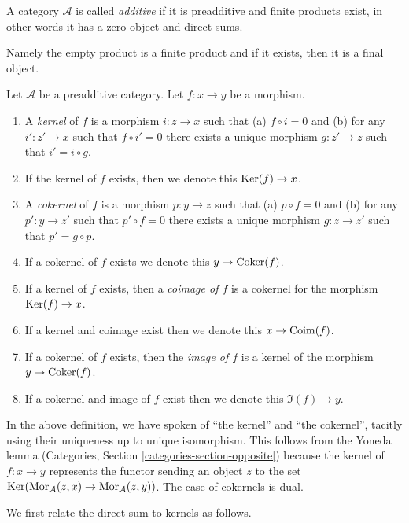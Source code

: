 \begin{definition}
\label{definition-additive-category}
A category $\mathcal{A}$ is called {\it
additive}
if it is preadditive and finite products
exist, in other
words it has a zero object and direct sums.
\end{definition}

\noindent
Namely the empty product is a finite product
and
if it exists, then it is a final object.

\begin{definition}
\label{definition-kernel}
Let $\mathcal{A}$ be a preadditive category.
Let $f : x \to y$ be a morphism.
\begin{enumerate}
\item A {\it kernel} of $f$ is a morphism
$i : z \to x$ such that (a) $f \circ i = 0$
and (b)
for any $i' : z' \to x$ such that $f \circ i'
= 0$ there
exists a unique morphism $g : z' \to z$ such
that
$i' = i \circ g$.
\item If the kernel of $f$ exists, then we
denote
this $\mathop{\mathrm{Ker}}(f) \to x$.
\item A {\it cokernel} of $f$ is a morphism
$p : y \to z$ such that (a) $p \circ f = 0$
and (b)
for any $p' : y \to z'$ such that $p' \circ f
= 0$ there
exists a unique morphism $g : z \to z'$ such
that
$p' = g \circ p$.
\item If a cokernel of $f$ exists we denote
this
$y \to \mathop{\mathrm{Coker}}(f)$.
\item If a kernel of $f$ exists, then a {\it
coimage
of $f$} is a cokernel for the morphism
$\mathop{\mathrm{Ker}}(f) \to x$.
\item If a kernel and coimage exist then we
denote this
$x \to \mathop{\mathrm{Coim}}(f)$.
\item If a cokernel of $f$ exists, then the
{\it image of
$f$} is a kernel of the morphism $y \to
\mathop{\mathrm{Coker}}(f)$.
\item If a cokernel and image of $f$ exist
then we denote
this $\Im(f) \to y$.
\end{enumerate}
\end{definition}

\noindent
In the above definition, we have spoken of
``the kernel'' and
``the cokernel'', tacitly using their
uniqueness
up to unique isomorphism. This follows from
the Yoneda lemma
(Categories, Section
\ref{categories-section-opposite})
because the kernel of $f : x \to y$
represents the functor
sending an object $z$ to the set
$\mathop{\mathrm{Ker}}(\mathop{\mathrm{Mor}}\nolimits_\mathcal{A}(z, x) \to
\mathop{\mathrm{Mor}}\nolimits_\mathcal{A}(z, y))$.
The case of cokernels is dual.

\medskip\noindent
We first relate the direct sum to kernels as
follows.

